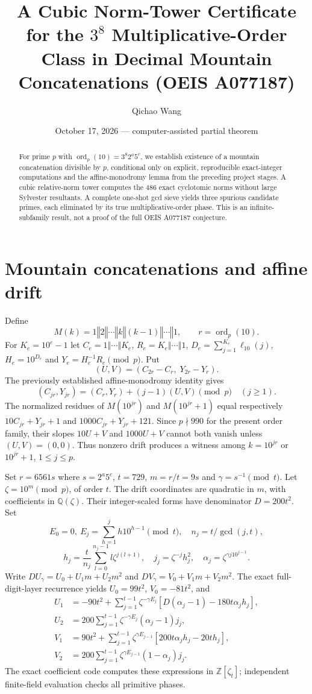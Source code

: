 \documentclass[9pt]{extarticle}
\title{A Cubic Norm-Tower Certificate for the $3^8$ Multiplicative-Order Class in Decimal Mountain Concatenations (OEIS A077187)}
\author{Qichao Wang}
\date{October 17, 2026 --- computer-assisted partial theorem}
\DeclareMathOperator{\ord}{ord}
\newcommand{\cat}{\mathbin{\Vert}}
\begin{document}
\maketitle
\begin{abstract}
For prime $p$ with $\ord_p(10)=3^8 2^a5^c$, we establish existence of a mountain concatenation divisible by $p$, conditional only on explicit, reproducible exact-integer computations and the affine-monodromy lemma from the preceding project stages. A cubic relative-norm tower computes the 486 exact cyclotomic norms without large Sylvester resultants. A complete one-shot gcd sieve yields three spurious candidate primes, each eliminated by its true multiplicative-order phase. This is an infinite-subfamily result, not a proof of the full OEIS A077187 conjecture.
\end{abstract}
\section{Mountain concatenations and affine drift}
Define
\[
M(k)=1\cat2\cat\cdots\cat k\cat(k-1)\cat\cdots\cat1,\qquad r=\ord_p(10).
\]
For $K_e=10^e-1$ let $C_e=1\cat\cdots\cat K_e$, $R_e=K_e\cat\cdots\cat1$, $D_e=\sum_{j=1}^{K_e}\ell_{10}(j)$, $H_e=10^{D_e}$ and $Y_e=H_e^{-1}R_e\pmod p$. Put
\[
(U,V)=(C_{2r}-C_r,\;Y_{2r}-Y_r).
\]
The previously established affine-monodromy identity \cite{stage7} gives
\begin{equation}\label{eq:affine}
(C_{jr},Y_{jr})=(C_r,Y_r)+(j-1)(U,V)\pmod p\quad(j\ge1).
\end{equation}
The normalized residues of $M(10^{jr})$ and $M(10^{jr}+1)$ equal respectively $10C_{jr}+Y_{jr}+1$ and $1000C_{jr}+Y_{jr}+121$. Since $p\nmid990$ for the present order family, their slopes $10U+V$ and $1000U+V$ cannot both vanish unless $(U,V)=(0,0)$. Thus nonzero drift produces a witness among $k=10^{jr}$ or $10^{jr}+1$, $1\le j\le p$.

Set $r=6561s$ where $s=2^a5^c$, $t=729$, $m=r/t=9s$ and $\gamma=s^{-1}\pmod t$. Let $\zeta=10^m\pmod p$, of order $t$. The drift coordinates are quadratic in $m$, with coefficients in $\mathbb Q(\zeta)$. Their integer-scaled forms have denominator $D=200t^2$. Set
\[
E_0=0,\ E_j=\sum_{h=1}^{j}h10^{h-1}\pmod t,\quad n_j=t/\gcd(j,t),
\]
\[
h_j=\frac{t}{n_j}\sum_{l=0}^{n_j-1}l\zeta^{j(l+1)},\quad
j_j=\zeta^{-j}h_j^2,\quad
\alpha_j=\zeta^{\gamma j10^{j-1}}.
\]
Write $DU_\gamma=U_0+U_1m+U_2m^2$ and $DV_\gamma=V_0+V_1m+V_2m^2$. The exact full-digit-layer recurrence yields
$U_0=99t^2$, $V_0=-81t^2$, and
\begin{align*}
U_1&=-90t^2+\sum_{j=1}^{t-1}\zeta^{-\gamma E_j}
 [D(\alpha_j-1)-180t\alpha_j h_j],\\
U_2&=200\sum_{j=1}^{t-1}\zeta^{-\gamma E_j}(\alpha_j-1)j_j,\\
V_1&=90t^2+\sum_{j=1}^{t-1}\zeta^{\gamma E_{j-1}}
 [200t\alpha_jh_j-20th_j],\\
V_2&=200\sum_{j=1}^{t-1}\zeta^{\gamma E_{j-1}}(1-\alpha_j)j_j.
\end{align*}
The exact coefficient code computes these expressions in $\mathbb Z[\zeta_t]$; independent finite-field evaluation checks all primitive phases.
\end{document}
